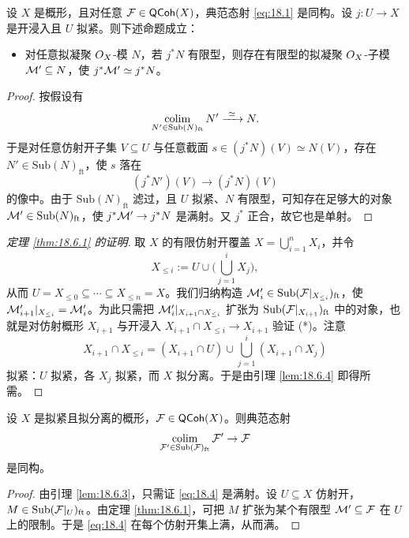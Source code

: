 \begin{lemma}\label{lem:18.6.5}
设 $X$ 是概形，且对任意 $\mathcal{F}\in\mathsf{QCoh}(X)$，典范态射 \eqref{eq:18.1} 是同构。设 $j:U\to X$ 是开浸入且 $U$ 拟紧。则下述命题成立：
\begin{itemize}[leftmargin=1.5em,itemsep=0.15ex]
  \item[(*)] 对任意拟凝聚 $O_X$-模 $N$，若 $j^*N$ 有限型，则存在有限型的拟凝聚 $O_X$-子模 $\mathcal{M}'\subseteq N$，使 $j^*\mathcal{M}'\simeq j^*N$。
\end{itemize}
\end{lemma}

\begin{proof}
按假设有
\[
\colim_{N'\in\mathrm{Sub}(N)_{\mathrm{ft}}}N'\xrightarrow{\ \simeq\ }N.
\]
于是对任意仿射开子集 $V\subseteq U$ 与任意截面 $s\in(j^*N)(V)\simeq N(V)$，存在 $N'\in\mathrm{Sub}(N)_{\mathrm{ft}}$，使 $s$ 落在
\[
(j^*N')(V)\to(j^*N)(V)
\]
的像中。由于 $\mathrm{Sub}(N)_{\mathrm{ft}}$ 滤过，且 $U$ 拟紧、$N$ 有限型，可知存在足够大的对象 $\mathcal{M}'\in\mathrm{Sub}(N)_{\mathrm{ft}}$，使 $j^*\mathcal{M}'\to j^*N$ 是满射。又 $j^*$ 正合，故它也是单射。
\end{proof}

\begin{proof}[定理 \ref{thm:18.6.1} 的证明]
取 $X$ 的有限仿射开覆盖 $X=\bigcup_{i=1}^nX_i$，并令
\[
X_{\le i}:=U\cup\Big(\bigcup_{j=1}^iX_j\Big),
\]
从而 $U=X_{\le 0}\subseteq\cdots\subseteq X_{\le n}=X$。我们归纳构造 $\mathcal{M}'_i\in\mathrm{Sub}(\mathcal{F}|_{X_{\le i}})_{\mathrm{ft}}$，使 $\mathcal{M}'_{i+1}|_{X_{\le i}}=\mathcal{M}'_i$。为此只需把 $\mathcal{M}'_i|_{X_{i+1}\cap X_{\le i}}$ 扩张为 $\mathrm{Sub}(\mathcal{F}|_{X_{i+1}})_{\mathrm{ft}}$ 中的对象，也就是对仿射概形 $X_{i+1}$ 与开浸入 $X_{i+1}\cap X_{\le i}\to X_{i+1}$ 验证 (*)。注意
\[
X_{i+1}\cap X_{\le i}=(X_{i+1}\cap U)\cup\bigcup_{j=1}^i(X_{i+1}\cap X_j)
\]
拟紧：$U$ 拟紧，各 $X_j$ 拟紧，而 $X$ 拟分离。于是由引理 \ref{lem:18.6.4} 即得所需。
\end{proof}

\begin{theorem}\label{thm:18.6.6}
设 $X$ 是拟紧且拟分离的概形，$\mathcal{F}\in\mathsf{QCoh}(X)$。则典范态射
\begin{equation}\label{eq:18.4}
\operatorname*{colim}_{\mathcal{F}'\in\mathrm{Sub}(\mathcal{F})_{\mathrm{ft}}}\mathcal{F}'\to\mathcal{F}
\end{equation}
是同构。
\end{theorem}

\begin{proof}
由引理 \ref{lem:18.6.3}，只需证 \eqref{eq:18.4} 是满射。设 $U\subseteq X$ 仿射开，$M\in\mathrm{Sub}(\mathcal{F}|_U)_{\mathrm{ft}}$。由定理 \ref{thm:18.6.1}，可把 $M$ 扩张为某个有限型 $\mathcal{M}'\subseteq\mathcal{F}$ 在 $U$ 上的限制。于是 \eqref{eq:18.4} 在每个仿射开集上满，从而满。
\end{proof}
